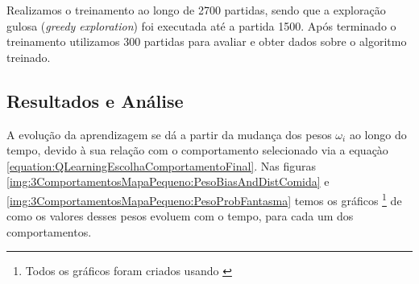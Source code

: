 Realizamos o treinamento ao longo de 2700 partidas, sendo que a exploração gulosa (\textit{greedy exploration}) foi executada até a partida 1500. Após terminado o treinamento utilizamos 300 partidas para avaliar e obter dados sobre o algoritmo treinado.


\subsection{Resultados e Análise}

A evolução da aprendizagem se dá a partir da mudança dos pesos $ \omega_i $ ao longo do tempo, devido à sua relação com o comportamento selecionado via a equaçào \ref{equation:QLearningEscolhaComportamentoFinal}. Nas figuras \ref{img:3ComportamentosMapaPequeno:PesoBiasAndDistComida} e \ref{img:3ComportamentosMapaPequeno:PesoProbFantasma} temos os gráficos%
\footnote{Todos os gráficos foram criados usando \cite{Hunter:2007}%
} de como os valores desses pesos evoluem com o tempo, para cada um dos comportamentos.

